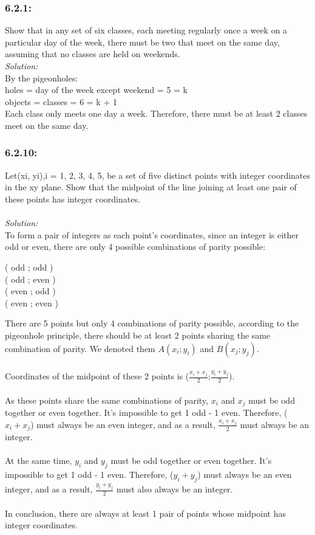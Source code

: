 \documentclass[a4paper]{article}
\begin{document}
	\subsubsection*{6.2.1:}
	Show that in any set of six classes, each meeting regularly once a week on a particular day of the week, there must be two that meet on the same day, assuming that no classes are held on weekends.\\
	\textit{Solution:}\\
	By the pigeonholes: \\
	holes = day of the week except weekend = 5 = k \\
	objects = classes = 6 = k + 1 \\
	Each class only meets one day a week. Therefore, there must be at least 2 classes meet on the same day.
	\subsubsection*{6.2.10:}
	Let(xi, yi),i = 1, 2, 3, 4, 5, be a set of five distinct points with integer coordinates in the xy plane. Show that the midpoint of the line joining at least one pair of these points has integer coordinates.\\\\
	\textit{Solution:}\\
	To form a pair of integers as each point's coordinates, since an integer is either odd or even, there are only 4 possible combinations of parity possible:
	\begin{center}
	    ( odd ; odd )\\
	    ( odd ; even )\\
	    ( even ; odd )\\
	    ( even ; even )\\
	\end{center}
	There are 5 points but only 4 combinations of parity possible, according to the pigeonhole principle, there should be at least 2 points sharing the same combination of parity. We denoted them $A(x_i;y_i)$ and $B(x_j;y_j)$.\\\\
	Coordinates of the midpoint of these 2 points is ($\frac{x_i+x_j}{2}$;$\frac{y_i+y_j}{2}$).\\\\
	As these points share the same combinations of parity, $x_i$ and $x_j$ must be odd together or even together. It's impossible to get 1 odd - 1 even. Therefore, ($x_i + x_j$) must always be an even integer, and as a result, $\frac{x_i+x_j}{2}$ must always be an integer.\\\\
	At the same time, $y_i$ and $y_j$ must be odd together or even together. It's impossible to get 1 odd - 1 even. Therefore, ($y_i + y_j$) must always be an even integer, and as a result, $\frac{y_i+y_j}{2}$ must also always be an integer.\\\\
	In conclusion, there are always at least 1 pair of points whose midpoint has integer coordinates.
\end{document}
